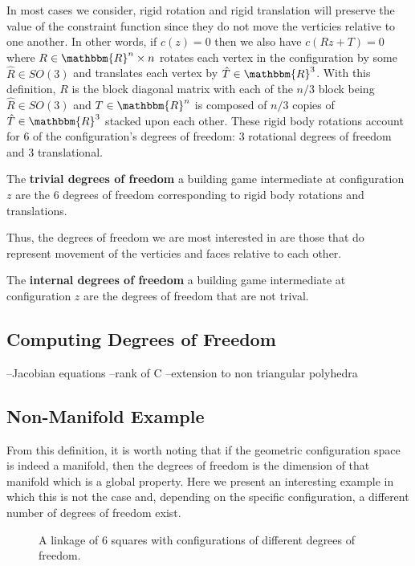 In most cases we consider, rigid rotation and rigid translation will preserve the value of the constraint function since they do not move the verticies relative to one another. In other words, if $c(z) = 0$ then we also have $c(Rz + T) = 0$ where $R \in \mathbbm{R}^{n}\times n$ rotates each vertex in the configuration by some $\hat{R} \in SO(3)$ and translates each vertex by $\hat{T} \in \mathbbm{R}^3$. With this definition, $R$ is the block diagonal matrix with each of the $n/3$ block being $\hat{R} \in SO(3)$ and $T \in \mathbbm{R}^n$ is composed of $n/3$ copies of $\hat{T} \in \mathbbm{R}^3$ stacked upon each other. These rigid body rotations account for $6$ of the configuration's degrees of freedom: $3$ rotational degrees of freedom and $3$ translational.
\begin{mydef}
The \textbf{trivial degrees of freedom} a building game intermediate at configuration $z$ are the $6$ degrees of freedom corresponding to rigid body rotations and translations.
\end{mydef}
Thus, the degrees of freedom we are most interested in are those that do represent movement of the verticies and faces relative to each other. 
\begin{mydef}
The \textbf{internal degrees of freedom} a building game intermediate at configuration $z$ are the degrees of freedom that are not trival.
\end{mydef}

\subsection{Computing Degrees of Freedom}

--Jacobian equations
--rank of C
--extension to non triangular polyhedra

\subsection{Non-Manifold Example}
From this definition, it is worth noting that if the geometric configuration space is indeed a manifold, then the degrees of freedom is the dimension of that manifold which is a global property. Here we present an interesting example in which this is not the case and, depending on the specific configuration, a different number of degrees of freedom exist.

\begin{figure}[ht]
\caption{A linkage of 6 squares with configurations of different degrees of freedom.}
\label{fig:SixSq}
\end{figure}


